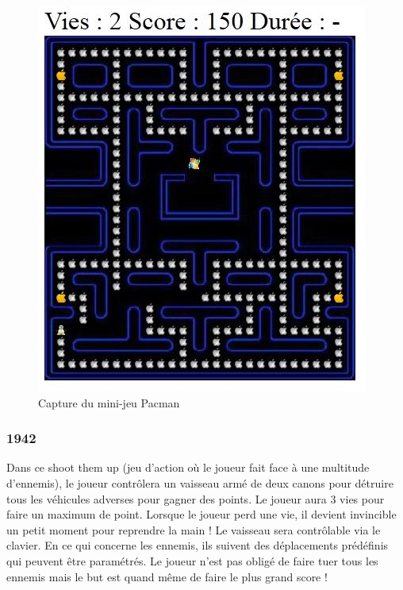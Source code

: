\begin{figure}
 \includegraphics[width=\linewidth]{img/capturejeu_pacman}
 \caption{Capture du mini-jeu Pacman}
 \label{fig:game_pacman}
\end{figure}

\subsubsection{1942}

Dans ce shoot them up (jeu d’action où le joueur fait face à une multitude d’ennemis), 
le joueur contrôlera un vaisseau armé de deux canons pour détruire tous les véhicules adverses pour gagner des points. 
Le joueur aura 3 vies pour faire un maximum de point. Lorsque le joueur perd une vie, il devient invincible un petit moment pour reprendre la main ! 
Le vaisseau sera contrôlable via le clavier. En ce qui concerne les ennemis, ils suivent des déplacements prédéfinis qui peuvent être paramétrés. 
Le joueur n’est pas obligé de faire tuer tous les ennemis mais le but est quand même de faire le plus grand score !

